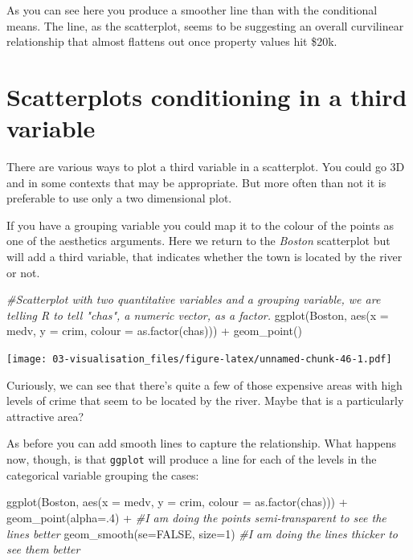 \documentclass[
]{book}
\newenvironment{Shaded}{\begin{snugshade}}{\end{snugshade}}
\newcommand{\AttributeTok}[1]{\textcolor[rgb]{0.77,0.63,0.00}{#1}}
\newcommand{\CommentTok}[1]{\textcolor[rgb]{0.56,0.35,0.01}{\textit{#1}}}
\newcommand{\ConstantTok}[1]{\textcolor[rgb]{0.00,0.00,0.00}{#1}}
\newcommand{\DecValTok}[1]{\textcolor[rgb]{0.00,0.00,0.81}{#1}}
\newcommand{\FunctionTok}[1]{\textcolor[rgb]{0.00,0.00,0.00}{#1}}
\newcommand{\NormalTok}[1]{#1}
\newcommand{\SpecialCharTok}[1]{\textcolor[rgb]{0.00,0.00,0.00}{#1}}
\begin{document}
As you can see here you produce a smoother line than with the conditional means. The line, as the scatterplot, seems to be suggesting an overall curvilinear relationship that almost flattens out once property values hit \$20k.

\hypertarget{scatterplots-conditioning-in-a-third-variable}{%
\section{Scatterplots conditioning in a third variable}\label{scatterplots-conditioning-in-a-third-variable}}

There are various ways to plot a third variable in a scatterplot. You could go 3D and in some contexts that may be appropriate. But more often than not it is preferable to use only a two dimensional plot.

If you have a grouping variable you could map it to the colour of the points as one of the aesthetics arguments. Here we return to the \emph{Boston} scatterplot but will add a third variable, that indicates whether the town is located by the river or not.

\begin{Shaded}
\begin{Highlighting}[]
\CommentTok{\#Scatterplot with two quantitative variables and a grouping variable, we are telling R to tell "chas", a numeric vector, as a factor. }
\FunctionTok{ggplot}\NormalTok{(Boston, }\FunctionTok{aes}\NormalTok{(}\AttributeTok{x =}\NormalTok{ medv, }\AttributeTok{y =}\NormalTok{ crim, }\AttributeTok{colour =} \FunctionTok{as.factor}\NormalTok{(chas))) }\SpecialCharTok{+}
  \FunctionTok{geom\_point}\NormalTok{() }
\end{Highlighting}
\end{Shaded}

\texttt{[image: 03-visualisation\_files/figure-latex/unnamed-chunk-46-1.pdf]}

Curiously, we can see that there's quite a few of those expensive areas with high levels of crime that seem to be located by the river. Maybe that is a particularly attractive area?

As before you can add smooth lines to capture the relationship. What happens now, though, is that \texttt{ggplot} will produce a line for each of the levels in the categorical variable grouping the cases:

\begin{Shaded}
\begin{Highlighting}[]
\FunctionTok{ggplot}\NormalTok{(Boston, }\FunctionTok{aes}\NormalTok{(}\AttributeTok{x =}\NormalTok{ medv, }\AttributeTok{y =}\NormalTok{ crim, }\AttributeTok{colour =} \FunctionTok{as.factor}\NormalTok{(chas))) }\SpecialCharTok{+}
  \FunctionTok{geom\_point}\NormalTok{(}\AttributeTok{alpha=}\NormalTok{.}\DecValTok{4}\NormalTok{) }\SpecialCharTok{+} \CommentTok{\#I am doing the points semi{-}transparent to see the lines better}
  \FunctionTok{geom\_smooth}\NormalTok{(}\AttributeTok{se=}\ConstantTok{FALSE}\NormalTok{, }\AttributeTok{size=}\DecValTok{1}\NormalTok{) }\CommentTok{\#I am doing the lines thicker to see them better}
\end{Highlighting}
\end{Shaded}
\end{document}
